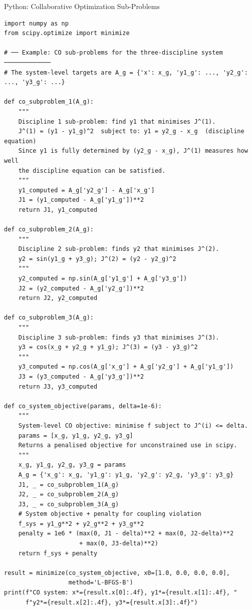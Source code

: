 \documentclass[aspectratio=169,10pt]{beamer}
\begin{document}
\begin{frame}[fragile]{Python: Collaborative Optimization Sub-Problems}

  \begin{lstlisting}[style=python]
import numpy as np
from scipy.optimize import minimize

# ── Example: CO sub-problems for the three-discipline system ─────────────
# The system-level targets are A_g = {'x': x_g, 'y1_g': ..., 'y2_g': ..., 'y3_g': ...}

def co_subproblem_1(A_g):
    """
    Discipline 1 sub-problem: find y1 that minimises J^(1).
    J^(1) = (y1 - y1_g)^2  subject to: y1 = y2_g - x_g  (discipline equation)
    Since y1 is fully determined by (y2_g - x_g), J^(1) measures how well
    the discipline equation can be satisfied.
    """
    y1_computed = A_g['y2_g'] - A_g['x_g']
    J1 = (y1_computed - A_g['y1_g'])**2
    return J1, y1_computed

def co_subproblem_2(A_g):
    """
    Discipline 2 sub-problem: finds y2 that minimises J^(2).
    y2 = sin(y1_g + y3_g); J^(2) = (y2 - y2_g)^2
    """
    y2_computed = np.sin(A_g['y1_g'] + A_g['y3_g'])
    J2 = (y2_computed - A_g['y2_g'])**2
    return J2, y2_computed

def co_subproblem_3(A_g):
    """
    Discipline 3 sub-problem: finds y3 that minimises J^(3).
    y3 = cos(x_g + y2_g + y1_g); J^(3) = (y3 - y3_g)^2
    """
    y3_computed = np.cos(A_g['x_g'] + A_g['y2_g'] + A_g['y1_g'])
    J3 = (y3_computed - A_g['y3_g'])**2
    return J3, y3_computed

def co_system_objective(params, delta=1e-6):
    """
    System-level CO objective: minimise f subject to J^(i) <= delta.
    params = [x_g, y1_g, y2_g, y3_g]
    Returns a penalised objective for unconstrained use in scipy.
    """
    x_g, y1_g, y2_g, y3_g = params
    A_g = {'x_g': x_g, 'y1_g': y1_g, 'y2_g': y2_g, 'y3_g': y3_g}
    J1, _ = co_subproblem_1(A_g)
    J2, _ = co_subproblem_2(A_g)
    J3, _ = co_subproblem_3(A_g)
    # System objective + penalty for coupling violation
    f_sys = y1_g**2 + y2_g**2 + y3_g**2
    penalty = 1e6 * (max(0, J1 - delta)**2 + max(0, J2-delta)**2
                     + max(0, J3-delta)**2)
    return f_sys + penalty

result = minimize(co_system_objective, x0=[1.0, 0.0, 0.0, 0.0],
                  method='L-BFGS-B')
print(f"CO system: x*={result.x[0]:.4f}, y1*={result.x[1]:.4f}, "
      f"y2*={result.x[2]:.4f}, y3*={result.x[3]:.4f}")
  \end{lstlisting}

\end{frame}
\end{document}

